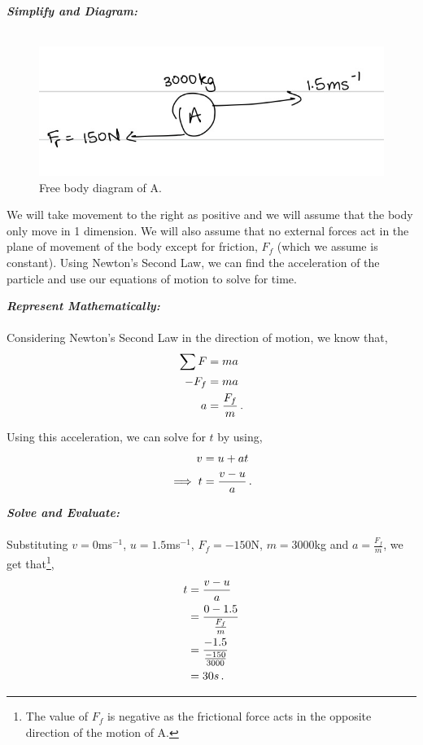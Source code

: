 \begin{subquestions}
\begin{subsubquestions}
	
	
	
\textbf{\textit{Simplify and Diagram:}} \\ \\
\begin{figure}[H]
	\begin{center}
		\includegraphics[scale=0.25]{../2016/figures/2016q6-4}
		\caption{\label{2016:q6:Diagram4} Free body diagram of A.}
	\end{center}
\end{figure}
We will take movement to the right as positive and we will assume that the body only move in 1 dimension. We will also assume that no external forces act in the plane of movement of the body except for friction, $F_f$ (which we assume is constant). Using Newton's Second Law, we can find the acceleration of the particle and use our equations of motion to solve for time.




\textbf{\textit{Represent Mathematically:}} \\ \\
Considering Newton's Second Law in the direction of motion, we know that,
\begin{align}
	\sum F & = ma \nonumber \\
	-F_f & = ma \nonumber \\
	a & = \frac{F_f}{m} \,.
\end{align}

Using this acceleration, we can solve for $t$ by using,
\begin{align}
	v & = u + at \nonumber \\
	\implies t & = \frac{v-u}{a} \,.
\end{align}




\textbf{\textit{Solve and Evaluate:}} \\ \\
Substituting $v=0$ms$^{-1}$, $u=1.5$ms$^{-1}$, $F_f=-150$N, $m=3000$kg and $a = \frac{F_f}{m}$, we get that\footnote{The value of $F_f$ is negative as the frictional force acts in the opposite direction of the motion of A.},
\begin{align}
	t & = \frac{v-u}{a} \nonumber \\
	  & = \frac{0-1.5}{\frac{F_f}{m}} \nonumber \\
	  & = \frac{-1.5}{\frac{-150}{3000}} \nonumber \\
	  & = 30s \,.
\end{align}

\end{subsubquestions}

\end{subquestions}


